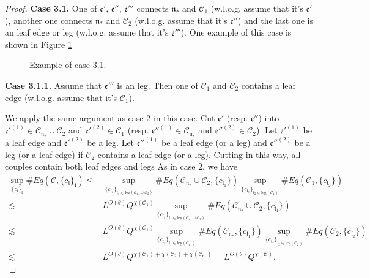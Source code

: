 \begin{proof}
\textbf{Case 3.1.} One of  $\mathfrak{e}'$, $\mathfrak{e}''$, $\mathfrak{e}'''$ connects $\mathfrak{n}_*$ and $\mathcal{C}_1$ (w.l.o.g. assume that it's $\mathfrak{e}'$), another one connects $\mathfrak{n}_*$ and $\mathcal{C}_2$ (w.l.o.g. assume that it's $\mathfrak{e}''$) and the last one is an leaf edge or leg (w.l.o.g. assume that it's $\mathfrak{e}'''$). One example of this case is shown in Figure \ref{fig.examplecase3.1}
\begin{figure}[H]
        \caption{Example of case 3.1.}
        \centering
        \label{fig.examplecase3.1}
    \end{figure}
    
\textbf{Case 3.1.1.} Assume that $\mathfrak{e}'''$ is an leg. Then one of $\mathcal{C}_1$ and $\mathcal{C}_2$ contains a leaf edge (w.l.o.g. assume that it's $\mathcal{C}_1$). 

We apply the same argument as case 2 in this case. Cut $\mathfrak{e}'$ (resp. $\mathfrak{e}''$) into $\mathfrak{e}'^{(1)}\in  \mathcal{C}_{\mathfrak{n}_*}\cup \mathcal{C}_2$ and $\mathfrak{e}'^{(2)}\in  \mathcal{C}_1$ (resp. $\mathfrak{e}''^{(1)}\in  \mathcal{C}_{\mathfrak{n}_*}$ and $\mathfrak{e}''^{(2)}\in  \mathcal{C}_2$). Let $\mathfrak{e}'^{(1)}$ be a leaf edge and $\mathfrak{e}'^{(2)}$ be a leg. Let $\mathfrak{e}''^{(1)}$ be a leaf edge (or a leg) and $\mathfrak{e}''^{(2)}$ be a leg (or a leaf edge) if $\mathcal{C}_2$ contains a leaf edge (or a leg). Cutting in this way, all couples contain both leaf edges and legs
As in case 2, we have
\begin{equation}
\begin{split}
    \sup_{\{c_{\mathfrak{l}}\}_{\mathfrak{l}}}\#Eq(\mathcal{C},\{c_{\mathfrak{l}}\}_{\mathfrak{l}})
    \le&
    \sup_{\{c_{\mathfrak{l}_1}\}_{\mathfrak{l}_1\in \text{leg}(\mathcal{C}_{\mathfrak{n}_*}\cup \mathcal{C}_2)} } \# Eq(\mathcal{C}_{\mathfrak{n}_*}\cup \mathcal{C}_2,\{c_{\mathfrak{l}_1}\}) \sup_{\{c_{\mathfrak{l}_2}\}_{\mathfrak{l}_2\in \text{leg}(\mathcal{C}_1)} }\# Eq(\mathcal{C}_{1}, \{c_{\mathfrak{l}_2}\})
    \\
    \lesssim&  L^{O(\theta)} Q^{\chi(\mathcal{C}_1)}\sup_{\{c_{\mathfrak{l}_1}\}_{\mathfrak{l}_1\in \text{leg}(\mathcal{C}_{\mathfrak{n}_*}\cup \mathcal{C}_2)} } \# Eq(\mathcal{C}_{\mathfrak{n}_*}\cup \mathcal{C}_2,\{c_{\mathfrak{l}_1}\})
    \\
    \lesssim&  L^{O(\theta)} Q^{\chi(\mathcal{C}_1)} \sup_{\{c_{\mathfrak{l}_1}\}_{\mathfrak{l}_1\in \text{leg}(\mathcal{C}_{\mathfrak{n}_*})} } \# Eq(\mathcal{C}_{\mathfrak{n}_*},\{c_{\mathfrak{l}_1}\}) \sup_{\{c_{\mathfrak{l}_2}\}_{\mathfrak{l}_2\in \text{leg}(\mathcal{C}_2)} }\# Eq(\mathcal{C}_{2}, \{c_{\mathfrak{l}_2}\})
    \\
    \lesssim&  L^{O(\theta)} Q^{\chi(\mathcal{C}_1)+\chi(\mathcal{C}_2)+\chi(\mathcal{C}_{\mathfrak{n}_*})}=L^{O(\theta)} Q^{\chi(\mathcal{C})}.
\end{split}
\end{equation}


\end{proof}
